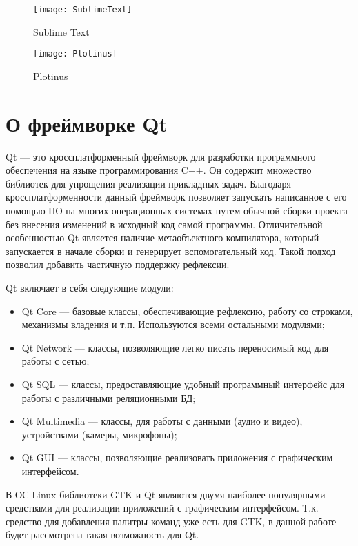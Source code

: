 \begin{figure}[h]
	\centering
	\texttt{[image: SublimeText]}
	\label{sublimetext}
	\caption{Sublime Text}
\end{figure}

\begin{figure}[h]
	\centering
	\texttt{[image: Plotinus]}
	\caption{Plotinus}
\end{figure}

\section{О фреймворке Qt}

Qt — это кроссплатформенный фреймворк для разработки программного обеспечения
на языке программирования C++\cite{qtabout}. Он содержит множество библиотек для
упрощения реализации прикладных задач. Благодаря кроссплатформенности данный
фреймворк позволяет запускать написанное с его помощью ПО на многих операционных
системах путем обычной сборки проекта без внесения изменений в исходный код
самой программы. Отличительной особенностью Qt является наличие метаобъектного
компилятора, который запускается в начале сборки и генерирует
вспомогательный код. Такой подход позволил добавить частичную поддержку
рефлексии.

Qt включает в себя следующие модули:

\begin{itemize}
    \item Qt Core — базовые классы, обеспечивающие рефлексию, работу со
        строками, механизмы владения и т.п. Используются всеми остальными
        модулями;
    \item Qt Network — классы, позволяющие легко писать переносимый код для
        работы с сетью;
    \item Qt SQL — классы, предоставляющие удобный программный интерфейс для
        работы с различными реляционными БД;
    \item Qt Multimedia — классы, для работы с данными (аудио и видео),
        устройствами (камеры, микрофоны);
    \item Qt GUI — классы, позволяющие реализовать приложения с графическим
        интерфейсом.
\end{itemize}

В ОС Linux библиотеки GTK и Qt являются двумя наиболее популярными средствами
для реализации приложений с графическим интерфейсом. Т.к. средство для
добавления палитры команд уже есть для GTK, в данной работе будет рассмотрена
такая возможность для Qt.

